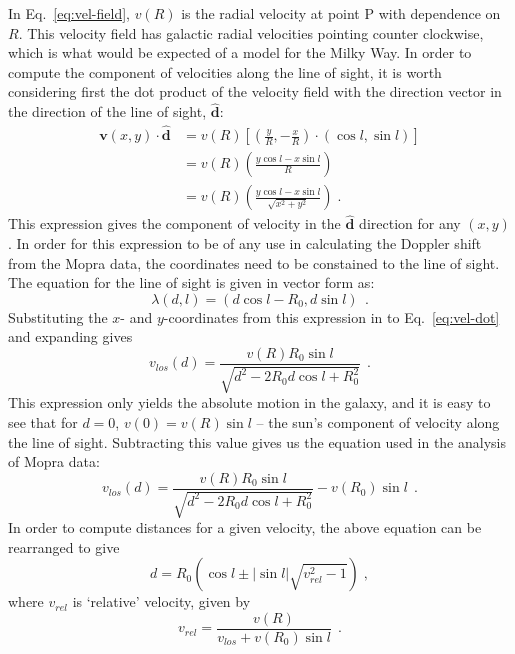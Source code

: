 \documentclass[a4paper, titlepage, oneside]{article}
\begin{document}
In Eq.~\eqref{eq:vel-field}, \(v(R)\) is the radial velocity at point P with dependence on \(R\). This velocity field has galactic radial velocities pointing counter clockwise, which is what would be expected of a model for the Milky Way. In order to compute the component of velocities along the line of sight, it is worth considering first the dot product of the velocity field with the direction vector in the direction of the line of sight, \(\mathbf{\hat{d}}\):
\begin{align}
  \mathbf{v}(x,y)\cdot\mathbf{\hat{d}}&=v(R)\left[\left(\frac{y}{R},-\frac{x}{R}\right)\!\cdot(\cos{l},\sin{l})\right] \\
  &=v(R)\left(\frac{y\cos{l}-x\sin{l}}{R}\right) \\
  &=v(R)\left(\frac{y\cos{l}-x\sin{l}}{\sqrt{x^2+y^2}}\right)\;.
  \label{eq:vel-dot}
\end{align}
This expression gives the component of velocity in the \(\mathbf{\hat{d}}\) direction for any \((x,y)\). In order for this expression to be of any use in calculating the Doppler shift from the Mopra data, the coordinates need to be constained to the line of sight. The equation for the line of sight is given in vector form as:
\begin{equation}
  \lambda(d,l)=(d\cos{l}-R_0,d\sin{l})\;\,.
\end{equation}
Substituting the \(x\)- and \(y\)-coordinates from this expression in to Eq.~\eqref{eq:vel-dot} and expanding gives
\begin{equation}
  v_{los}(d)=\frac{v(R)R_0\sin{l}}{\sqrt{d^2-2R_0d\cos{l}+R_0^2}}\;\,.
\end{equation}
This expression only yields the absolute motion in the galaxy, and it is easy to see that for \(d=0\), \(v(0)=v(R)\sin{l}\) -- the sun's component of velocity along the line of sight. Subtracting this value gives us the equation used in the analysis of Mopra data:
\begin{equation}
  v_{los}(d)=\frac{v(R)R_0\sin{l}}{\sqrt{d^2-2R_0d\cos{l}+R_0^2}}-v(R_0)\sin{l}\;\,.
\end{equation}
In order to compute distances for a given velocity, the above equation can be rearranged to give
\begin{equation}
  d=R_0\left(\cos{l}\pm|\sin{l}|\sqrt{v_{rel}^2-1}\right)\;,
\end{equation}
where \(v_{rel}\) is `relative' velocity, given by
\begin{equation}
  v_{rel}=\frac{v(R)}{v_{los}+v(R_0)\sin{l}}\;\,.
\end{equation}
\end{document}
